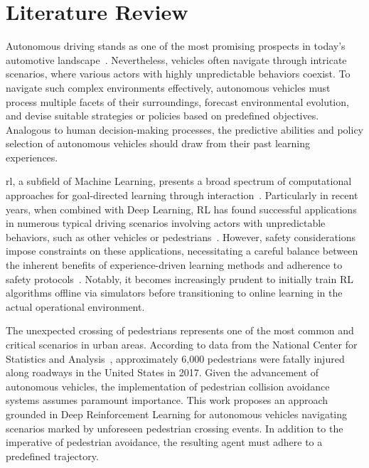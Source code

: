 
\section*{Literature Review}


Autonomous driving stands as one of the most promising prospects in today's automotive landscape~\cite{geiger2012ready}. Nevertheless, vehicles often navigate through intricate scenarios, where various actors with highly unpredictable behaviors coexist. To navigate such complex environments effectively, autonomous vehicles must process multiple facets of their surroundings, forecast environmental evolution, and devise suitable strategies or policies based on predefined objectives. Analogous to human decision-making processes, the predictive abilities and policy selection of autonomous vehicles should draw from their past learning experiences.

\gls{rl}, a subfield of Machine Learning, presents a broad spectrum of computational approaches for goal-directed learning through interaction~\cite{sutton2018reinforcement}. Particularly in recent years, when combined with Deep Learning, RL has found successful applications in numerous typical driving scenarios involving actors with unpredictable behaviors, such as other vehicles or pedestrians~\cite{deshpande2019deep, kim2020unexpected}. However, safety considerations impose constraints on these applications, necessitating a careful balance between the inherent benefits of experience-driven learning methods and adherence to safety protocols~\cite{d2020data, tipaldi2020applying}. Notably, it becomes increasingly prudent to initially train RL algorithms offline via simulators before transitioning to online learning in the actual operational environment.

The unexpected crossing of pedestrians represents one of the most common and critical scenarios in urban areas. According to data from the National Center for Statistics and Analysis~\cite{ncsa2017pedestrians}, approximately 6,000 pedestrians were fatally injured along roadways in the United States in 2017. Given the advancement of autonomous vehicles, the implementation of pedestrian collision avoidance systems assumes paramount importance. This work proposes an approach grounded in Deep Reinforcement Learning for autonomous vehicles navigating scenarios marked by unforeseen pedestrian crossing events. In addition to the imperative of pedestrian avoidance, the resulting agent must adhere to a predefined trajectory.

